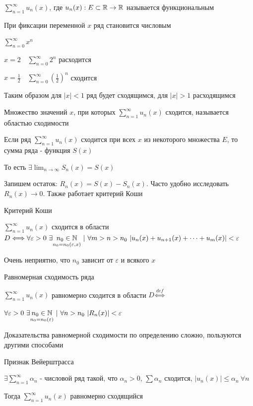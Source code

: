 \documentclass[12pt]{article}
\begin{document}
    \Def $\sum_{n = 1}^\infty u_n(x)$, где $u_n(x) : E \subset \mathbb{R} \to \mathbb{R}$ называется функциональным

    \Notas При фиксации переменной $x$ ряд становится числовым

    \Exs $\sum_{n = 0}^\infty x^n$

    $x = 2 \quad \sum_{n = 0}^\infty 2^n$ расходится

    $x = \frac{1}{2} \quad \sum_{n = 0}^\infty (\frac{1}{2})^n$ сходится

    Таким образом для $|x| < 1$ ряд будет сходящимся, для $|x| > 1$ расходящимся

    \Def Множество значений $x$, при которых $\sum_{n = 1}^\infty u_n(x)$ сходится, называется областью сходимости

    \Defs Если ряд $\sum_{n = 1}^\infty u_n(x)$ сходится при всех $x$ из некоторого множества $E$, то сумма ряда -
    функция $S(x)$

    \Nota То есть $\exists \lim_{n \to \infty} S_n(x) = S(x)$

    Запишем остаток: $R_n(x) = S(x) - S_n(x)$. Часто удобно исследовать $R_n(x) \to 0$. Также работает критерий Коши

    \begin{MyTheorem}
        \Ths Критерий Коши

        $\sum_{n = 1}^\infty u_n(x)$ сходится в области $D \Longleftrightarrow
        \forall \varepsilon > 0 \ \exists \underset{n_0 = n_0(\varepsilon, x)}{n_0 \in \mathbb{N}} \ | \
        \forall m > n > n_0 \ |u_n(x) + u_{n + 1}(x) + \dots + u_m(x)| < \varepsilon$
    \end{MyTheorem}

    \Notas Очень неприятно, что $n_0$ зависит от $\varepsilon$ и всякого $x$

    \Def Равномерная сходимость ряда

    $\sum_{n = 1}^\infty u_n(x)$ равномерно сходится в области $D \overset{def}{\Longleftrightarrow}$

    $\forall \varepsilon > 0 \ \exists \underset{n_0 = n_0(\varepsilon)}{n_0 \in \mathbb{N}} \ | \ \forall n > n_0 \ |R_n(x)| < \varepsilon$

    \Nota Доказательства равномерной сходимости по определению сложно, пользуются другими способами

    \begin{MyTheorem}
        \Ths Признак Вейерштрасса

        $\exists \sum_{n = 1}^\infty \alpha_n$ - числовой ряд такой, что $\alpha_n > 0$, $\sum \alpha_n$ сходится,
        $|u_n(x)| \leq \alpha_n \ \forall n$

        Тогда $\sum_{n = 1}^\infty u_n(x)$ равномерно сходящийся

    \end{MyTheorem}
\end{document}

